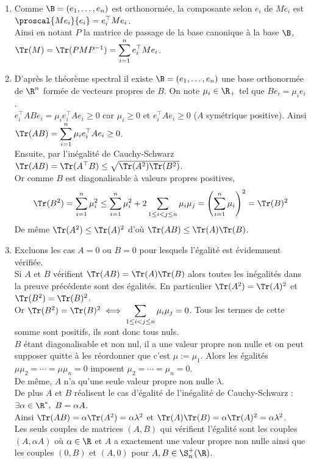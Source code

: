 \documentclass[8pt]{book}
\begin{document}
	\begin{enumerate}[leftmargin=*]
		\item Comme $\B=(e_1,\dots,e_n)$ est orthonormée, la composante selon $e_i$ de $Me_i$ est $\proscal{Me_i}{e_i}=e_i^\top Me_i$.\\
		Ainsi en notant $P$ la matrice de passage de la base canonique à la base $\B$, $\Tr(M)=\Tr(PMP^{-1})=\displaystyle\sum_{i=1}^ne_i^\top Me_i$.
		\item D'après le théorème spectral il existe $\B=(e_1,\dots,e_n)$ une base orthonormée de $\R^n$ formée de vecteurs propres de $B$. On note $\mu_i\in \R_+$ tel que $Be_i=\mu_ie_i$.\\
		$e_i^\top ABe_i=\mu_ie_i^\top Ae_i\geq 0$ car $\mu_i\geq 0$ et $e_i^\top Ae_i\geq 0$ ($A$ symétrique positive). Ainsi $\Tr(AB)=\displaystyle\sum_{i=1}^n\mu_ie_i^\top Ae_i\geq 0$.\\
		Ensuite, par l'inégalité de Cauchy-Schwarz $\Tr(AB)=\Tr(A^\top B)\leq \sqrt{\Tr(A^2)\Tr(B^2)}$.\\
		Or comme $B$ est diagonalisable à valeurs propres positives,
		$$\Tr(B^2)=\displaystyle\sum_{i=1}^n\mu_i^2\leq \sum_{i=1}^n\mu_i^2+2\sum_{1\leq i<j\leq n}\mu_i\mu_j=\left(\sum_{i=1}^n\mu_i\right)^2=\Tr(B)^2$$
		De même $\Tr(A^2)\leq \Tr(A)^2$ d'où $\Tr(AB)\leq \Tr(A)\Tr(B)$.
		\item Excluons les cas $A=0$ ou $B=0$ pour lesquels l'égalité est évidemment vérifiée.\\
		Si $A$ et $B$ vérifient $\Tr(AB)=\Tr(A)\Tr(B)$ alors toutes les inégalités dans la preuve précédente sont des égalités. En particulier $\Tr(A^2)=\Tr(A)^2$ et $\Tr(B^2)=\Tr(B)^2$.\\
		Or $\Tr(B^2)=\Tr(B)^2\iff \displaystyle\sum_{1\leq i<j\leq n}\mu_i\mu_j=0$. Tous les termes de cette somme sont positifs, ils sont donc tous nuls.\\
		$B$ étant diagonalisable et non nul, il a une valeur propre non nulle et on peut supposer quitte à les réordonner que c'est $\mu:=\mu_1$. Alors les égalités $\mu\mu_2=\cdots=\mu\mu_n=0$ imposent $\mu_2=\cdots=\mu_n=0$.\\
		De même, $A$ n'a qu'une seule valeur propre non nulle $\lambda$.\\
		De plus $A$ et $B$ réalisent le cas d'égalité de l'inégalité de Cauchy-Schwarz : $\exists \alpha\in \R^*,\ B=\alpha A$.\\
		Ainsi $\Tr(AB)=\alpha\Tr(A^2)=\alpha\lambda^2$ et $\Tr(A)\Tr(B)=\alpha\Tr(A)^2=\alpha\lambda^2$.\\
		Les seuls couples de matrices $(A,B)$ qui vérifient l'égalité sont les couples $(A,\alpha A)$ où $\alpha\in \R$ et $A$ a exactement une valeur propre non nulle ainsi que les couples $(0,B)$ et $(A,0)$ pour $A,B\in \S_n^+(\R)$.
	\end{enumerate}
	
\end{document}
